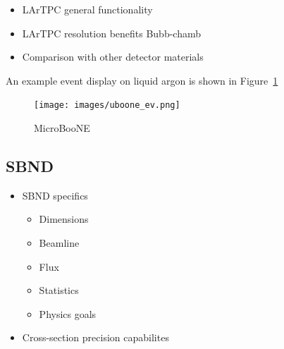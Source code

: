         

    \begin{itemize}

        \item LArTPC general functionality
        \item LArTPC resolution benefits
        Bubb-chamb


        \item Comparison with other detector materials
    
    \end{itemize}

    An example event display on liquid argon is shown in Figure~\ref{fig:ev_disp} \cite{evDisp}
    \begin{figure}[h!]
        \center
        \texttt{[image: images/uboone\_ev.png]}
        \caption{MicroBooNE}
        \label{fig:ev_disp}
    \end{figure}


\subsection{SBND}    

    \begin{itemize}
    
        \item SBND specifics

        \begin{itemize}

            \item Dimensions
            \item Beamline
            \item Flux
            \item Statistics
            \item Physics goals

        \end{itemize}
        
        \item Cross-section precision capabilites

    \end{itemize}

    
    
 \clearpage
